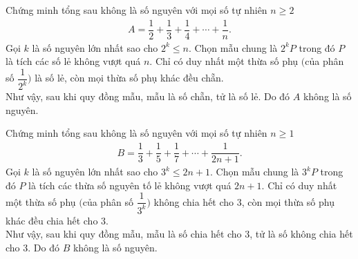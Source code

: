 \begin{bt}%
 Chứng minh tổng sau không là số nguyên với mọi số tự nhiên $n \geq 2$
 \begin{eqnarray*}
  A= \dfrac{1}{2} + \dfrac{1}{3} + \dfrac{1}{4} + \cdots + \dfrac{1}{n}.
 \end{eqnarray*}
 \loigiai
  {
  Gọi $k$ là số nguyên lớn nhất sao cho $2^k \leq n$. Chọn mẫu chung là $2^kP$ trong đó $P$ là tích các số lẻ không vượt quá $n$. Chỉ có duy nhất một thừa số phụ $\Big($của phân số $\dfrac{1}{2^k} \Big)$ là số lẻ, còn mọi thừa số phụ khác đều chẵn.\\
  Như vậy, sau khi quy đồng mẫu, mẫu là số chẵn, tử là số lẻ. Do đó $A$ không là số nguyên.
  }
\end{bt}

\begin{bt}%
 Chứng minh tổng sau không là số nguyên với mọi số tự nhiên $n \geq 1$
 \begin{eqnarray*}
  B = \dfrac{1}{3} + \dfrac{1}{5} + \dfrac{1}{7} + \cdots + \dfrac{1}{2n+1}.
 \end{eqnarray*}
 \loigiai
  {
  Gọi $k$ là số nguyên lớn nhất sao cho $3^k \leq 2n+1$. Chọn mẫu chung là $3^kP$ trong đó $P$ là tích các thừa số nguyên tố lẻ không vượt quá $2n+1$. Chỉ có duy nhất một thừa số phụ $\Big($của phân số $\dfrac{1}{3^k} \Big)$ không chia hết cho $3$, còn mọi thừa số phụ khác đều chia hết cho $3$.\\
  Như vậy, sau khi quy đồng mẫu, mẫu là số chia hết cho $3$, tử là số không chia hết cho $3$. Do đó $B$ không là số nguyên.
  }
\end{bt}
